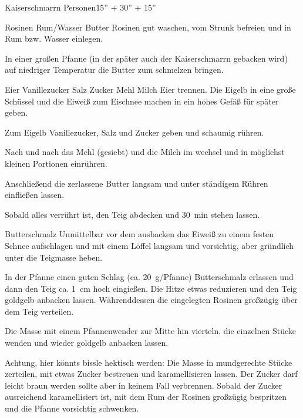 \begin{MyRecipe}{Kaiserschmarrn}{ Personen}{15'' + 30'' + 15''}
	
	\ingredient[\Calc{60}{\x}]{\si{\gram}} {Rosinen}
	 {Rum/Wasser}
	\ingredient[\Calc{30}{\x}]{\si{\gram}} {Butter}
	Rosinen gut waschen, vom Strunk befreien und in Rum bzw. Wasser einlegen.
	
	In einer großen Pfanne (in der später auch der Kaiserschmarrn gebacken wird) auf niedriger Temperatur die Butter zum schmelzen bringen.\par\bigskip
	
	\ingredient[\Calc{4}{\x}]{} {Eier}
	 {Vanillezucker}
	 {Salz}
	 {Zucker}
	\ingredient[\Calc{0.16}{\x}]{\si{\kilogram}} {Mehl}
	\ingredient[\Calc{0.33}{\x}]{\si{\kilogram}} {Milch}
	Eier trennen. Die Eigelb in eine große Schüssel und die Eiweiß zum Eischnee machen in ein hohes Gefäß für später geben.
	
	Zum Eigelb Vanillezucker, Salz und Zucker geben und schaumig rühren.
	
	Nach und nach das Mehl (gesiebt) und die Milch im wechsel und in möglichst kleinen Portionen einrühren.
	
	Anschließend die zerlassene Butter langsam und unter ständigem Rühren einfließen lassen.
	
	Sobald alles verrührt ist, den Teig abdecken und \SI{30}{\minute} stehen lassen.\par\bigskip
	
	 {Butterschmalz}
	Unmittelbar vor dem ausbacken das Eiweiß zu einem festen Schnee aufschlagen und mit einem Löffel langsam und vorsichtig, aber gründlich unter die Teigmasse heben.
	
	In der Pfanne einen guten Schlag (ca. \SI{20}{\gram}/Pfanne) Butterschmalz erlassen und dann den Teig ca. \SI{1}{\centi\meter} hoch eingießen. Die Hitze etwas reduzieren und den Teig goldgelb anbacken lassen. Währenddessen die eingelegten Rosinen großzügig über dem Teig verteilen.
	
	Die Masse mit einem Pfannenwender zur Mitte hin vierteln, die einzelnen Stücke wenden und wieder goldgelb anbacken lassen.
	
	Achtung, hier könnts bissle hektisch werden:
	Die Masse in mundgerechte Stücke zerteilen, mit etwas Zucker bestreuen und karamellisieren lassen. Der Zucker darf leicht braun werden sollte aber in keinem Fall verbrennen. Sobald der Zucker ausreichend karamellisiert ist, mit dem Rum der Rosinen großzügig bespritzen und die Pfanne vorsichtig schwenken.\par\bigskip
	

\end{MyRecipe}
